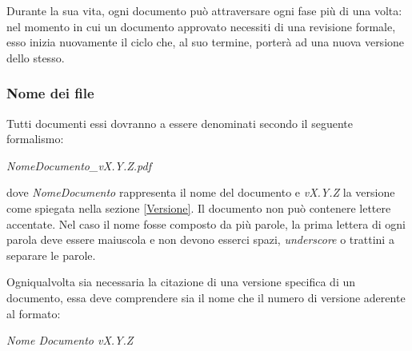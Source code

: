 \documentclass[12pt,a4paper]{article}
\begin{document}
Durante la sua vita, ogni documento può attraversare ogni fase più di una volta: nel momento in cui un documento approvato necessiti di una revisione formale, esso inizia nuovamente il ciclo che, al suo termine, porterà ad una nuova versione dello stesso.

\subsubsection{Nome dei file}

Tutti documenti essi dovranno a essere denominati secondo il seguente formalismo:
\begin{center}
	\emph{NomeDocumento\_vX.Y.Z.pdf}
\end{center}
dove \emph{NomeDocumento} rappresenta il nome del documento e \emph{vX.Y.Z} la versione come spiegata nella sezione \ref{Versione}. Il documento non può contenere lettere accentate. Nel caso il nome fosse composto da più parole, la prima lettera di ogni parola deve essere maiuscola e non devono esserci spazi, \emph{underscore} o trattini a separare le parole.

Ogniqualvolta sia necessaria la citazione di una versione specifica di un documento, essa deve comprendere sia il nome che il numero di versione aderente al formato:
\begin{center}
	\emph{Nome Documento vX.Y.Z}
\end{center}
\end{document}
